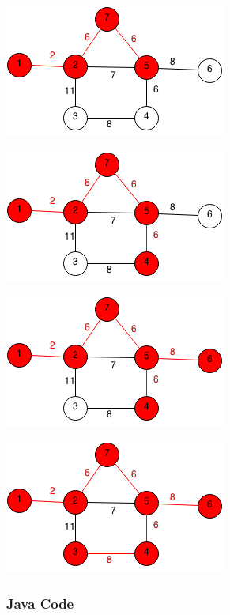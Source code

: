 \documentclass[11pt,oneside]{book}
\makeatletter
\def\maxwidth#1{\ifdim\Gin@nat@width>#1 #1\else\Gin@nat@width\fi}
\makeatother
\begin{document}
\vspace{5px}\includegraphics[width=\maxwidth{\textwidth}]{prim4.png}

\vspace{5px}\includegraphics[width=\maxwidth{\textwidth}]{prim5.png}

\vspace{5px}\includegraphics[width=\maxwidth{\textwidth}]{prim6.png}

\vspace{5px}\includegraphics[width=\maxwidth{\textwidth}]{prim7.png}

\subsubsection{Java Code}
\end{document}
